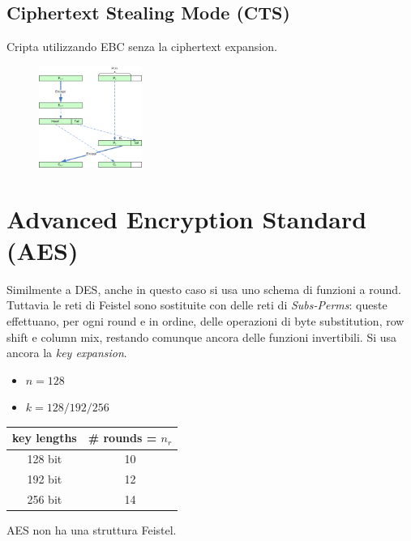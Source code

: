 \documentclass[a4paper,12pt]{article}
\begin{document}
\subsection{Ciphertext Stealing Mode (CTS)}
Cripta utilizzando EBC senza la ciphertext expansion.
\begin{figure}[H]
  \centering
  \includegraphics[width=0.3\textwidth]{img/cts}
\end{figure}

\section{Advanced Encryption Standard (AES)}
Similmente a DES, anche in questo caso si usa uno schema di funzioni a round.
Tuttavia le reti di Feistel sono sostituite con delle reti di \textit{Subs-Perms}: queste effettuano, per ogni round e in ordine, delle operazioni di byte substitution, row shift e column mix, restando comunque ancora delle funzioni invertibili. 
Si usa ancora la \textit{key expansion}.
\begin{itemize}
	\item $n = 128$
	\item $k = 128/192/256$
\end{itemize}

\begin{center}
\begin{tabular}{ c | c }
key lengths & \# rounds = $n_r$ \\
\hline
128 bit & 10 \\ 
192 bit & 12 \\  
256 bit & 14    
\end{tabular}
\end{center}
AES non ha una struttura Feistel.
\end{document}
